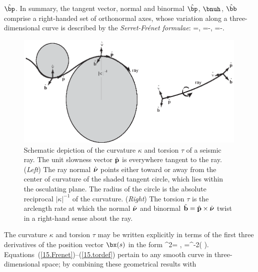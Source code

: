 $\hat{\bp}$.  In summary, the tangent vector, normal
and binormal $\hat{\bp}$, $\bnuh$, $\hat{\bb}$
comprise a right-handed set of orthonormal axes,
whose variation along a three-dimensional
curve is described by the
{\em Serret-Fr\'{e}net formulae\/}:
%
\eq \label{15.Frenet}
=\kappa\bnuh,\qquad
{}=\tau\hat{\bb}-\kappa\hat{\bp},\qquad
{}=-\tau\bnuh.
\en
\begin{figure}[!b]
\begin{center}
\includegraphics{../figures/chap15/fig01.eps}
\end{center}
\caption[curvature&torsion]
{\label{15.fig.curtor}
Schematic depiction of the curvature $\kappa$ and
torsion $\tau$ of a seismic ray.  The unit slowness
vector $\hat{\bf p}$ is everywhere tangent to the ray.
({\em Left}) The ray normal $\hat{\mbox{\boldmath $\nu$}}$
points either toward or away from the center
of curvature of the shaded tangent circle,
which lies within the osculating plane.
The radius of the circle is the absolute
reciprocal $|\kappa|^{-1}$ of the curvature.
({\em Right}) The torsion $\tau$ is
the arclength rate at which the normal
$\hat{\mbox{\boldmath $\nu$}}$ and
binormal $\hat{\bf b}=\hat{\bf p}
\times\hat{\mbox{\boldmath $\nu$}}$ twist in
a right-hand sense about the ray.}
\end{figure}
The curvature $\kappa$ and torsion $\tau$ may be written
explicitly in terms of the first three derivatives of the
position vector $\bx(s)$ in the form
\eq \label{15.kappadef}
\kappa^2=\cdot
{},
\en
\eq \label{15.tordef}
\tau=\kappa^{-2}\left(
\cdot{}\times
{}\right).
\en
Equations~(\ref{15.Frenet})--(\ref{15.tordef})
pertain to any smooth curve in three-dimensional space;
by combining these geometrical results with
